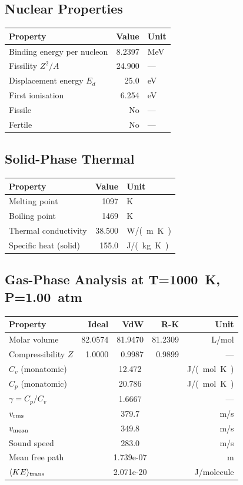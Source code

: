 \documentclass[11pt,a4paper]{article}
\begin{document}
\subsection{Nuclear Properties}
\begin{tabular}{lrl}
  \toprule
  Property & Value & Unit \\
  \midrule
  Binding energy per nucleon & 8.2397 & \si{MeV} \\
  Fissility $Z^2/A$ & 24.900 & --- \\
  Displacement energy $E_d$ & 25.0 & \si{eV} \\
  First ionisation & 6.254 & \si{eV} \\
  Fissile & No & --- \\
  Fertile & No & --- \\
  \bottomrule
\end{tabular}

\subsection{Solid-Phase Thermal}
\begin{tabular}{lrl}
  \toprule
  Property & Value & Unit \\
  \midrule
  Melting point & 1097 & \si{K} \\
  Boiling point & 1469 & \si{K} \\
  Thermal conductivity & 38.500 & \si{W/(m.K)} \\
  Specific heat (solid) & 155.0 & \si{J/(kg.K)} \\
  \bottomrule
\end{tabular}

\subsection{Gas-Phase Analysis at T=\SI{1000}{K}, P=\SI{1.00}{atm}}
\begin{tabular}{lrrrr}
  \toprule
  Property & Ideal & VdW & R-K & Unit \\
  \midrule
  Molar volume & 82.0574 & 81.9470 & 81.2309 & \si{L/mol} \\
  Compressibility $Z$ & 1.0000 & 0.9987 & 0.9899 & --- \\
  \midrule
  $C_v$ (monatomic) & \multicolumn{3}{c}{12.472} & \si{J/(mol.K)} \\
  $C_p$ (monatomic) & \multicolumn{3}{c}{20.786} & \si{J/(mol.K)} \\
  $\gamma = C_p/C_v$ & \multicolumn{3}{c}{1.6667} & --- \\
  $v_{\rm rms}$ & \multicolumn{3}{c}{379.7} & \si{m/s} \\
  $v_{\rm mean}$ & \multicolumn{3}{c}{349.8} & \si{m/s} \\
  Sound speed & \multicolumn{3}{c}{283.0} & \si{m/s} \\
  Mean free path & \multicolumn{3}{c}{1.739e-07} & \si{m} \\
  $\langle KE \rangle_{\rm trans}$ & \multicolumn{3}{c}{2.071e-20} & \si{J/molecule} \\
  \bottomrule
\end{tabular}
\end{document}
